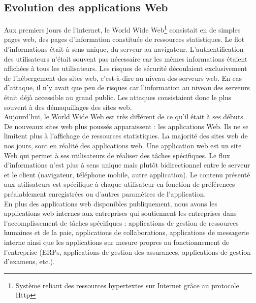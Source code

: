 \subsection{Evolution des applications Web}
Aux premiers jours de l’internet, le World Wide Web\footnote{Système reliant des ressources hypertextes sur Internet grâce au protocole Http} consistait en de simples pages web, des pages d’information constituée de ressources statistiques. Le flot d'informations était à sens unique, du serveur au navigateur. L’authentification des utilisateurs n’était souvent pas nécessaire car les mêmes informations étaient affichées à tous les utilisateurs. Les risques de sécurité découlaient exclusivement de l’hébergement des sites web, c’est-à-dire au niveau des serveurs web. En cas d’attaque, il n’y avait que peu de risques car l’information au niveau des serveurs était déjà accessible au grand public. Les attaques consistaient donc le plus souvent à des démaquillages des sites web.\\
Aujourd’hui, le World Wide Web est très différent de ce qu’il était à ses débuts. De nouveaux sites web plus poussés apparaissent : les applications Web. Ils ne se limitent plus à l’affichage de ressources statistiques. La majorité des sites web de nos jours, sont en réalité des applications web. Une application web est un site Web qui permet à ses utilisateurs de réaliser des tâches spécifiques. Le flux d’informations n’est plus à sens unique mais plutôt bidirectionnel entre le serveur et le client (navigateur, téléphone mobile, autre application). Le contenu présenté aux utilisateurs est spécifique à chaque utilisateur en fonction de préférences préalablement enregistrées ou d’autres paramètres de l’application. \\
En plus des applications web disponibles publiquement, nous avons les applications web internes aux entreprises qui soutiennent les entreprises dans l’accomplissement de tâches spécifiques : applications de gestion de ressources humaines et de la paie, applications de collaborations, applications de messagerie interne ainsi que les applications sur mesure propres au fonctionnement de l’entreprise (ERPs, applications de gestion des assurances, applications de gestion d’examens, etc.).\\
